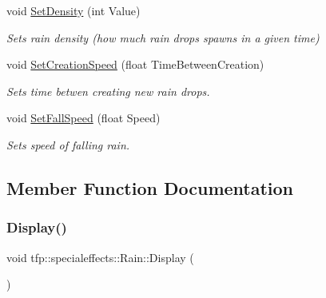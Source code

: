 \begin{DoxyCompactItemize}
\mbox{\label{classtfp_1_1specialeffects_1_1_rain_a8dc0d21ff7b21eab4c741699c5216dd0}} 
void \mbox{\hyperlink{classtfp_1_1specialeffects_1_1_rain_a8dc0d21ff7b21eab4c741699c5216dd0}{Set\+Density}} (int Value)
\begin{DoxyCompactList}\small\item\em Sets rain density (how much rain drops spawns in a given time) \end{DoxyCompactList}\item 
\mbox{\label{classtfp_1_1specialeffects_1_1_rain_a9f28f426b054f8a7028addb8b74159d8}} 
void \mbox{\hyperlink{classtfp_1_1specialeffects_1_1_rain_a9f28f426b054f8a7028addb8b74159d8}{Set\+Creation\+Speed}} (float Time\+Between\+Creation)
\begin{DoxyCompactList}\small\item\em Sets time betwen creating new rain drops. \end{DoxyCompactList}\item 
\mbox{\label{classtfp_1_1specialeffects_1_1_rain_ad74727aa55ddfcc25adb7b222068b935}} 
void \mbox{\hyperlink{classtfp_1_1specialeffects_1_1_rain_ad74727aa55ddfcc25adb7b222068b935}{Set\+Fall\+Speed}} (float Speed)
\begin{DoxyCompactList}\small\item\em Sets speed of falling rain. \end{DoxyCompactList}\end{DoxyCompactItemize}


\subsection{Member Function Documentation}
\mbox{\label{classtfp_1_1specialeffects_1_1_rain_a5a0baf62d50003eda4af4da3ebb0f0ee}} 
\subsubsection{\texorpdfstring{Display()}{Display()}}
{\footnotesize\ttfamily void tfp\+::specialeffects\+::\+Rain\+::\+Display (\begin{DoxyParamCaption}{ }\end{DoxyParamCaption})}




